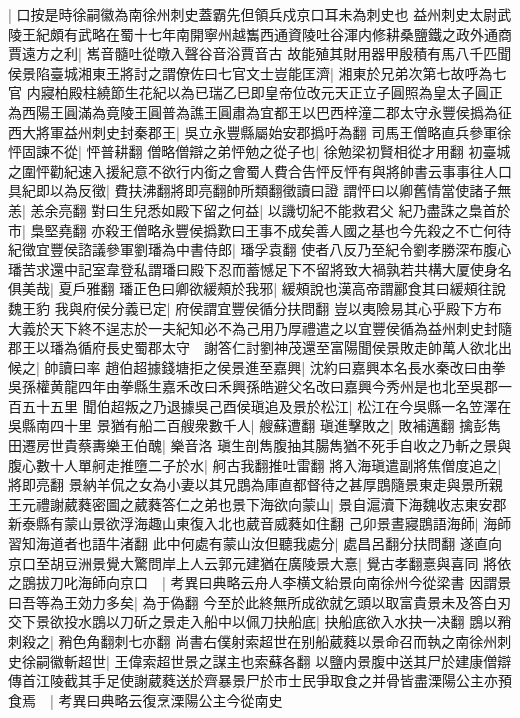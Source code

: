 |{
	口按是時徐嗣徽為南徐州刺史蓋霸先但領兵戍京口耳未為刺史也}
益州刺史太尉武陵王紀頗有武略在蜀十七年南開寧州越雟西通資陵吐谷渾内修耕桑鹽鐵之政外通商賈遠方之利|{
	嶲音髓吐從暾入聲谷音浴賈音古}
故能殖其財用器甲殷積有馬八千匹聞侯景陷臺城湘東王將討之謂僚佐曰七官文士豈能匡濟|{
	湘東於兄弟次第七故呼為七官}
内寢柏殿柱繞節生花紀以為已瑞乙巳即皇帝位改元天正立子圓照為皇太子圓正為西陽王圓滿為竟陵王圓普為譙王圓肅為宜都王以巴西梓潼二郡太守永豐侯撝為征西大將軍益州刺史封秦郡王|{
	吳立永豐縣屬始安郡撝吁為翻}
司馬王僧略直兵參軍徐怦固諫不從|{
	怦普耕翻}
僧略僧辯之弟怦勉之從子也|{
	徐勉梁初賢相從才用翻}
初臺城之圍怦勸紀速入援紀意不欲行内銜之會蜀人費合告怦反怦有與將帥書云事事往人口具紀即以為反徵|{
	費扶沸翻將即亮翻帥所類翻徵讀曰證}
謂怦曰以卿舊情當使諸子無恙|{
	恙余亮翻}
對曰生兒悉如殿下留之何益|{
	以譏切紀不能救君父}
紀乃盡誅之梟首於市|{
	梟堅堯翻}
亦殺王僧略永豐侯撝歎曰王事不成矣善人國之基也今先殺之不亡何待紀徵宜豐侯諮議參軍劉璠為中書侍郎|{
	璠孚袁翻}
使者八反乃至紀令劉孝勝深布腹心璠苦求還中記室韋登私謂璠曰殿下忍而蓄憾足下不留將致大禍孰若共構大厦使身名俱美哉|{
	夏戶雅翻}
璠正色曰卿欲緩頰於我邪|{
	緩頰說也漢高帝謂酈食其曰緩頰往說魏王豹}
我與府侯分義已定|{
	府侯謂宜豐侯循分扶問翻}
豈以夷險易其心乎殿下方布大義於天下終不逞志於一夫紀知必不為己用乃厚禮遣之以宜豐侯循為益州刺史封隨郡王以璠為循府長史蜀郡太守　謝答仁討劉神茂還至富陽聞侯景敗走帥萬人欲北出候之|{
	帥讀曰率}
趙伯超據錢塘拒之侯景進至嘉興|{
	沈約曰嘉興本名長水秦改曰由拳吳孫權黄龍四年由拳縣生嘉禾改曰禾興孫皓避父名改曰嘉興今秀州是也北至吳郡一百五十五里}
聞伯超叛之乃退據吳己酉侯瑱追及景於松江|{
	松江在今吳縣一名笠澤在吳縣南四十里}
景猶有船二百艘衆數千人|{
	艘蘇遭翻}
瑱進擊敗之|{
	敗補邁翻}
擒彭雋田遷房世貴蔡夀樂王伯醜|{
	樂音洛}
瑱生剖雋腹抽其腸雋猶不死手自收之乃斬之景與腹心數十人單舸走推墮二子於水|{
	舸古我翻推吐雷翻}
將入海瑱遣副將焦僧度追之|{
	將即亮翻}
景納羊侃之女為小妻以其兄鵾為庫直都督待之甚厚鵾隨景東走與景所親王元禮謝葳蕤密圖之葳蕤答仁之弟也景下海欲向蒙山|{
	景自滬瀆下海魏收志東安郡新泰縣有蒙山景欲浮海趣山東復入北也葳音威蕤如住翻}
己卯景晝寢鵾語海師|{
	海師習知海道者也語牛渚翻}
此中何處有蒙山汝但聽我處分|{
	處昌呂翻分扶問翻}
遂直向京口至胡豆洲景覺大驚問岸上人云郭元建猶在廣陵景大憙|{
	覺古孝翻憙與喜同}
將依之鵾拔刀叱海師向京口　|{
	考異曰典略云舟人李横文紿景向南徐州今從梁書}
因謂景曰吾等為王効力多矣|{
	為于偽翻}
今至於此終無所成欲就乞頭以取富貴景未及答白刃交下景欲投水鵾以刀斫之景走入船中以佩刀抉船底|{
	抉船底欲入水抉一决翻}
鵾以矟刺殺之|{
	矟色角翻刺七亦翻}
尚書右僕射索超世在别船葳蕤以景命召而執之南徐州刺史徐嗣徽斬超世|{
	王偉索超世景之謀主也索蘇各翻}
以鹽内景腹中送其尸於建康僧辯傳首江陵截其手足使謝葳蕤送於齊暴景尸於市士民爭取食之并骨皆盡溧陽公主亦預食焉　|{
	考異曰典略云復烹溧陽公主今從南史}
